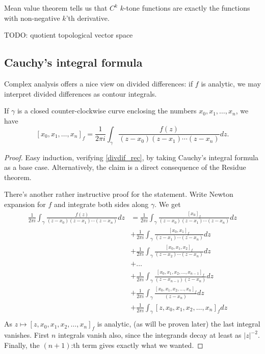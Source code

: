 Mean value theorem tells us that $C^{k}$ $k$-tone functions are exactly the functions with non-negative $k$'th derivative.

TODO: quotient topological vector space

\subsection{Cauchy's integral formula}

Complex analysis offers a nice view on divided differences: if $f$ is analytic, we may interpret divided differences as contour integrals.

\begin{lem}\label{div_cauchy}
If $\gamma$ is a closed counter-clockwise curve enclosing the numbers $x_{0}, x_{1}, \ldots, x_{n}$, we have
\[
	[x_{0}, x_{1}, \ldots, x_{n}]_{f} = \frac{1}{2 \pi i} \int_{\gamma} \frac{f(z)}{(z - x_{0})(z - x_{1}) \cdots (z - x_{n})} dz.
\]
\end{lem}
\begin{proof}
Easy induction, verifying \ref{divdif_rec}, by taking Cauchy's integral formula as a base case. Alternatively, the claim is a direct consequence of the Residue theorem.

There's another rather instructive proof for the statement. Write Newton expansion for $f$ and integrate both sides along $\gamma$. We get
\begin{align*}
	\frac{1}{2 \pi i} \int_{\gamma} \frac{f(z)}{(z - x_{0})(z - x_{1}) \cdots (z - x_{n})} dz &= \frac{1}{2 \pi i} \int_{\gamma} \frac{[x_{0}]_{f}}{(z - x_{0})(z - x_{1}) \cdots (z - x_{n})} dz \\
	&+ \frac{1}{2 \pi i} \int_{\gamma} \frac{[x_{0}, x_{1}]_{f}}{(z - x_{1}) \cdots (z - x_{n})} dz \\
	&+ \frac{1}{2 \pi i} \int_{\gamma} \frac{[x_{0}, x_{1}, x_{2}]_{f}}{(z - x_{2}) \cdots (z - x_{n})} dz \\
	&+ \ldots \\
	&+ \frac{1}{2 \pi i} \int_{\gamma} \frac{[x_{0}, x_{1}, x_{2}, \ldots, x_{n - 1}]_{f}}{(z - x_{n - 1})(z - x_{n})} dz \\
	&+ \frac{1}{2 \pi i} \int_{\gamma} \frac{[x_{0}, x_{1}, x_{2}, \ldots, x_{n}]_{f}}{(z - x_{n})} dz \\
	&+ \frac{1}{2 \pi i} \int_{\gamma} [z, x_{0}, x_{1}, x_{2}, \ldots, x_{n}]_{f} dz \\
\end{align*}
As $z \mapsto [z, x_{0}, x_{1}, x_{2}, \ldots, x_{n}]_{f}$ is analytic, (as will be proven later) the last integral vanishes. First $n$ integrals vanish also, since the integrands decay at least as $|z|^{-2}$. Finally, the $(n + 1)$:th term gives exactly what we wanted.
\end{proof}

